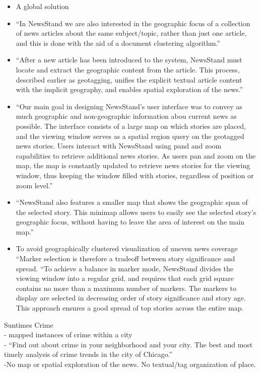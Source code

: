 \begin{itemize}
	\item {A global solution \cite{Teitler2008}}
	\item {\color{orange}“In NewsStand we are also interested in the geographic focus of a collection of news articles about the same subject/topic, rather than just one article, and this is done with the aid of a document clustering algorithm.” \cite{Teitler2008}}
	\item {\color{orange}“After a new article has been introduced to the system, NewsStand must locate and extract the geographic content from the article. This process, described earlier as geotagging, unifies the explicit textual article content with the implicit geography, and enables spatial exploration of the news.”\cite{Teitler2008}}
	\item {\color{orange} “Our main goal in designing NewsStand’s user interface was to convey as much geographic and non-geographic information abou current news as possible. The interface consists of a large map on which stories are placed, and the viewing window serves as a spatial region query on the geotagged news stories. Users interact with NewsStand using pand and zoom capabilities to retrieve additional news stories. As users pan and zoom on the map, the map is constantly updated to retrieve news stories for the viewing window, thus keeping the window filled with stories, regardless of position or zoom level.”\cite{Teitler2008}}
	\item {\color{orange} “NewsStand also features a smaller map that shows the geographic span of the selected story. This minimap allows users to easily see the selected story’s geographic focus, without having to leave the area of interest on the main map.” \cite{Teitler2008}}
	\item {\color{orange} To avoid geographically clustered visualization of uneven news coverage “Marker selection is therefore a tradeoff between story significance and spread. “To achieve a balance in marker mode, NewsStand divides the viewing window into a regular grid, and requires that each grid square contains no more than a maximum number of markers. The markers to display are selected in decreasing order of story significance and story age. This approach ensures a good spread of top stories across the entire map.\cite{Teitler2008}}\\
\end{itemize}

Suntimes Crime\\
-{\color{orange} mapped instances of crime within a city \cite{chicagosun2020}}\\
-{\color{orange}  “Find out about crime in your neighborhood and your city. The best and most timely analysis of crime trends in the city of Chicago.” \cite{chicagosun2020}}\\
-{\color{purple}No map or spatial exploration of the news. No textual/tag organization of place.}\\

